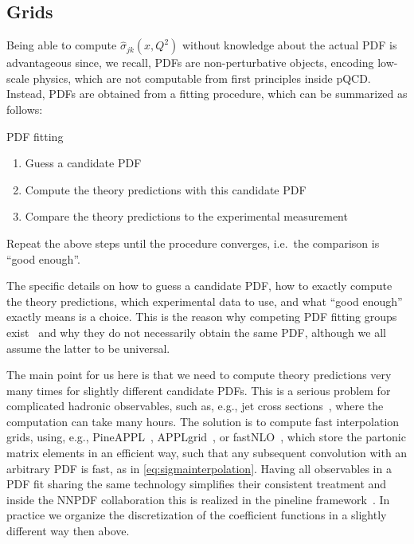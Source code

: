 \subsection{Grids}
\label{sec:grids}
Being able to compute $\hat \sigma_{jk}(x,Q^2)$ without knowledge about the actual PDF is advantageous since, we recall, PDFs are non-perturbative objects, encoding low-scale physics, which are not computable from first principles inside pQCD.
Instead, PDFs are obtained from a fitting procedure, which can be summarized as follows:
\begin{conclusionbox}{PDF fitting}
    \begin{enumerate}
        \item Guess a candidate PDF
        \item Compute the theory predictions with this candidate PDF
        \item Compare the theory predictions to the experimental measurement
    \end{enumerate}
    Repeat the above steps until the procedure converges, i.e.\ the comparison is \enquote{good enough}.
\end{conclusionbox}
The specific details on how to guess a candidate PDF, how to exactly compute the theory predictions, which experimental data to use, and what \enquote{good enough} exactly means is a choice.
This is the reason why competing PDF fitting groups exist~\cite{NNPDF:2021njg,Hou:2019efy,Bailey:2020ooq,PDF4LHCWorkingGroup:2022cjn,Accardi:2026hdv} and why they do not necessarily obtain the same PDF, although we all assume the latter to be universal.

The main point for us here is that we need to compute theory predictions very many times for slightly different candidate PDFs.
This is a serious problem for complicated hadronic observables, such as, e.g., jet cross sections~\cite{NNLOJET:2025rno}, where the computation can take many hours.
The solution is to compute fast interpolation grids, using, e.g., PineAPPL~\cite{Carrazza:2020gss,Jezo:2026adf,christopher_schwan_2025_15635174}, APPLgrid~\cite{Carli:2010rw}, or fastNLO~\cite{Wobisch:2011ij}, which store the partonic matrix elements in an efficient way, such that any subsequent convolution with an arbitrary PDF is fast, as in \cref{eq:sigmainterpolation}.
Having all observables in a PDF fit sharing the same technology simplifies their consistent treatment and inside the NNPDF collaboration this is realized in the pineline framework~\cite{Barontini:2023vmr}.
In practice we organize the discretization of the coefficient functions in a slightly different way then above.

